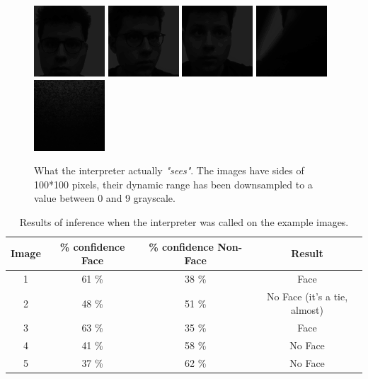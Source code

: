 \begin{figure}[ht!]
    \includegraphics[width = 2.8 cm]{images/inference/frame_0}\hfill
    \includegraphics[width = 2.8 cm]{images/inference/frame_1}\hfill
    \includegraphics[width = 2.8 cm]{images/inference/frame_3}\hfill
    \includegraphics[width = 2.8 cm]{images/inference/frame_4}\hfill
    \includegraphics[width = 2.8 cm]{images/inference/frame_5}\hfill
    \caption{What the interpreter actually \textit{"sees"}. The images have sides of 100*100 pixels, their dynamic range has been downsampled to a value between 0 and 9 grayscale.}
    \label{interpreter_eyes}
\end{figure}

\begin{table}
    \centering
    \begin{tabular}{|c|c|c|c|}
        \hline
        Image & \% confidence Face & \% confidence Non-Face  & Result \\ \hline
        1 & 61 \% & 38 \%  & Face \\ \hline
        2 & 48 \% & 51 \%  & No Face (it's a tie, almost)\\ \hline
        3 & 63 \% & 35 \%  & Face \\ \hline
        4 & 41 \% & 58 \%  & No Face \\ \hline
        5 & 37 \% & 62 \%  & No Face \\ \hline
    \end{tabular}
    \caption{Results of inference when the interpreter was called on the example images.}
    \label{tab:results}
\end{table}

